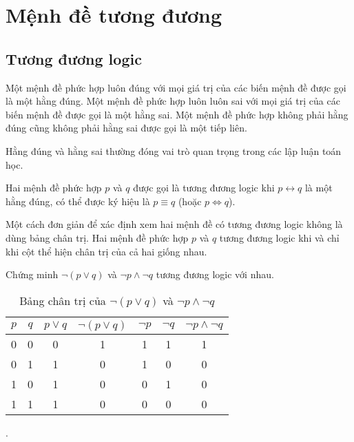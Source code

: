 \documentclass[11pt,fleqn]{book} %
\begin{document}

    \section{Mệnh đề tương đương}
    \subsection{Tương đương logic} 
        \begin{definition}
            Một mệnh đề phức hợp luôn đúng với mọi giá trị của các biến mệnh đề được gọi là một hằng đúng. Một mệnh đề phức hợp luôn luôn sai với mọi giá trị của các biến mệnh đề được gọi là một hằng sai. Một mệnh đề phức hợp không phải hằng đúng cũng không phải hằng sai được gọi là một tiếp liên.
        \end{definition}
        
        Hằng đúng và hằng sai thường đóng vai trò quan trọng trong các lập luận toán học.
        
        \begin{definition}
            Hai mệnh đề phức hợp $p$ và $q$ được gọi là tương đương logic khi $p \leftrightarrow q$ là một hằng đúng, có thể được ký hiệu là $p \equiv q$ (hoặc $p \Leftrightarrow q$).
        \end{definition}
        
        Một cách đơn giản để xác định xem hai mệnh đề có tương đương logic không là dùng bảng chân trị. Hai mệnh đề phức hợp $p$ và $q$ tương đương logic khi và chỉ khi cột thể hiện chân trị của cả hai giống nhau.
        
        \pagebreak
        \begin{example}
            Chứng minh $\neg (p \lor q)$ và $\neg p \land \neg q$ tương đương logic với nhau.
            \begin{table}[h!]
                \centering
                \setlength{\tabcolsep}{18pt}
                \begin{tabular}{c c c c c c c}
                    $p$ & $q$ & $p \lor q$ & $\neg (p \lor q)$ & $\neg p$ & $\neg q$ & $\neg p \land \neg q$\\ \hline
                    0 & 0 & 0 & 1 & 1 & 1 & 1\\
                    0 & 1 & 1 & 0 & 1 & 0 & 0\\
                    1 & 0 & 1 & 0 & 0 & 1 & 0\\
                    1 & 1 & 1 & 0 & 0 & 0 & 0 
                \end{tabular}
                \caption{Bảng chân trị của $\neg (p \lor q)$ và $\neg p \land \neg q$}.
            \end{table}
        \end{example}
        
\end{document}
